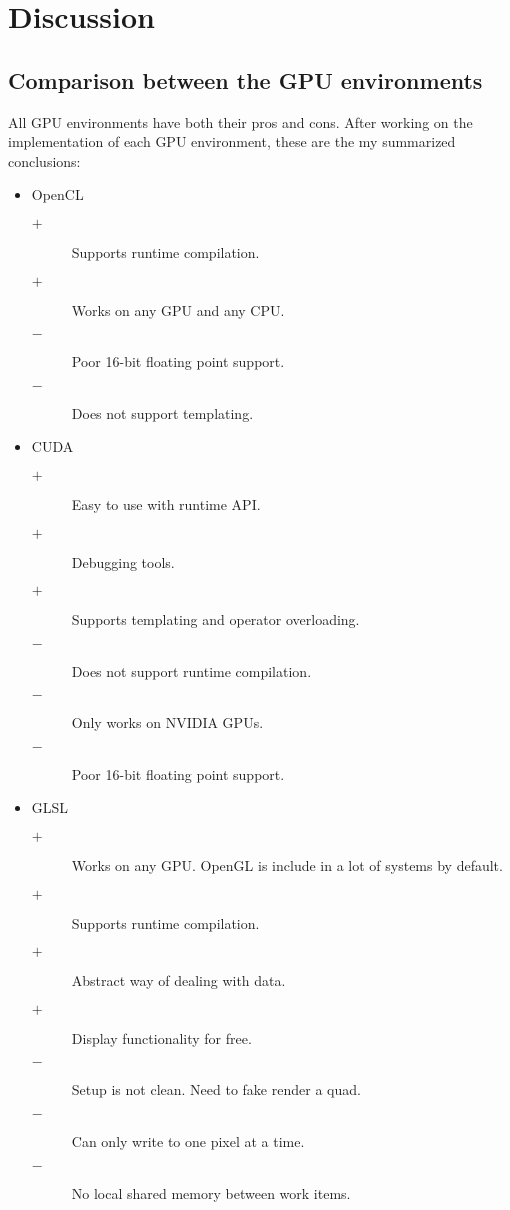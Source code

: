 \section{Discussion}
\subsection{Comparison between the GPU environments}

All GPU environments have both their pros and cons. After working on the implementation of each GPU environment, these are the my summarized conclusions:

\begin{itemize}
\item OpenCL
\begin{description}
  \item[$+$] Supports runtime compilation.
  \item[$+$] Works on any GPU and any CPU.
  \item[$-$] Poor 16-bit floating point support.
  \item[$-$] Does not support templating.
\end{description}
\item CUDA
\begin{description}
  \item[$+$] Easy to use with runtime API.
  \item[$+$] Debugging tools.
  \item[$+$] Supports templating and operator overloading.
  \item[$-$] Does not support runtime compilation.
  \item[$-$] Only works on NVIDIA GPUs.
  \item[$-$] Poor 16-bit floating point support.
\end{description}
\item GLSL
\begin{description}
  \item[$+$] Works on any GPU. OpenGL is include in a lot of systems by default.
  \item[$+$] Supports runtime compilation.
  \item[$+$] Abstract way of dealing with data.
  \item[$+$] Display functionality for free.
  \item[$-$] Setup is not clean. Need to fake render a quad.
  \item[$-$] Can only write to one pixel at a time.
  \item[$-$] No local shared memory between work items.
\end{description}
\end{itemize}

